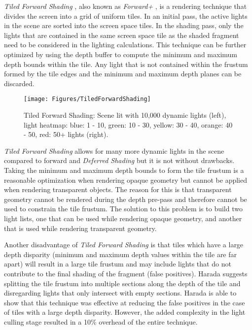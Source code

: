 \emph{Tiled Forward Shading} \parencite{13_olssonassarsson_2011}, also known as \emph{Forward+} \parencite{14_harada_2012, 15_mckee_2012}, is a rendering technique that divides the screen into a  grid of uniform tiles. In an initial pass, the active lights in the scene are sorted into the screen space tiles. In the shading pass, only the lights that are contained in the same screen space tile as the shaded fragment need to be considered in the lighting calculations. This technique can be further optimized by using the depth buffer to compute the minimum and maximum depth bounds within the tile. Any light that is not contained within the frustum formed by the tile edges and the minimum and maximum depth planes can be discarded.

\begin{figure}[h]
\centering
\texttt{[image: Figures/TiledForwardShading]}
\decoRule
\caption[TiledForwardShading]{Tiled Forward Shading: Scene lit with 10,000 dynamic lights (left), light heatmap: blue: 1 - 10, green: 10 - 30, yellow: 30 - 40, orange: 40 - 50, red: 50+ lights (right).}
\label{fig:TiledForwardShading}
\end{figure}

\emph{Tiled Forward Shading} allows for many more dynamic lights in the scene compared to forward and \emph{Deferred Shading} but it is not without drawbacks. Taking the minimum and maximum depth bounds to form the tile frustum is a reasonable optimization when rendering opaque geometry but cannot be applied when rendering transparent objects. The reason for this is that transparent geometry cannot be rendered during the depth pre-pass and therefore cannot be used to constrain the tile frustum. The solution to this problem is to build two light lists, one that can be used while rendering opaque geometry, and another that is used while rendering transparent geometry.

Another disadvantage of \emph{Tiled Forward Shading} is that tiles which have a large depth disparity (minimum and maximum depth values within the tile are far apart) will result in a large tile frustum and may include lights that do not contribute to the final shading of the fragment (false positives). Harada \parencite{16_harada_2012} suggests splitting the tile frustum into multiple sections along the depth of the tile and disregarding lights that only intersect with empty sections. Harada is able to show that this technique was effective at reducing the false positives in the case of tiles with a large depth disparity. However, the added complexity in the light culling stage resulted in a 10\% overhead of the entire technique.

